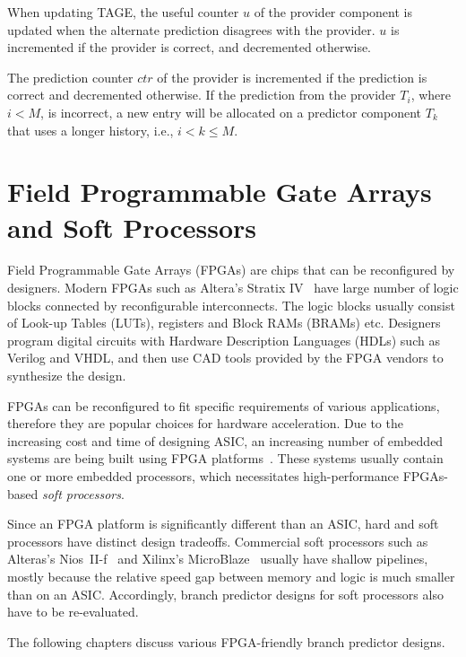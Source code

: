 When updating TAGE, the useful counter $u$ of the provider component is updated when the alternate prediction disagrees with the provider. $u$ is incremented if the provider is correct, and decremented otherwise.

The prediction counter $ctr$ of the provider is incremented if the prediction is correct and decremented otherwise. If the prediction from the provider $T_i$, where $i < M$, is incorrect, a new entry will be allocated on a predictor component $T_k$ that uses a longer history, i.e., $i<k\leq M$.


\section{Field Programmable Gate Arrays and Soft Processors}
\label{sec:background:fpga}
Field Programmable Gate Arrays (FPGAs) are chips that can be reconfigured by designers. Modern FPGAs such as Altera's Stratix IV~\cite{StratixIV} have large number of logic blocks connected by reconfigurable interconnects. The logic blocks usually consist of Look-up Tables (LUTs), registers and Block RAMs (BRAMs) etc. Designers program digital circuits with Hardware Description Languages (HDLs) such as Verilog and VHDL, and then use CAD tools provided by the FPGA vendors to synthesize the design.

FPGAs can be reconfigured to fit specific requirements of various applications, therefore they are popular choices for hardware acceleration. Due to the increasing cost and time of designing ASIC, an increasing number of embedded systems are being built using FPGA platforms~\cite{softprocessor}. These systems usually contain one or more embedded processors, which necessitates high-performance FPGAs-based \textit{soft processors}. 

Since an FPGA platform is significantly different than an ASIC, hard and soft processors have distinct design tradeoffs. Commercial soft processors such as Alteras's Nios~II-f~\cite{niosiif} and Xilinx's MicroBlaze~\cite{microblaze} usually have shallow pipelines, mostly because the relative speed gap between memory and logic is much smaller than on an ASIC. Accordingly, branch predictor designs for soft processors also have to be re-evaluated.

The following chapters discuss various FPGA-friendly branch predictor designs.

